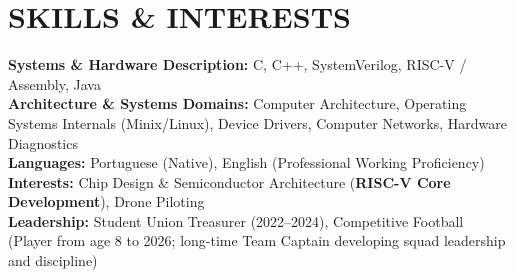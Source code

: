 \documentclass[letterpaper,11pt]{article}
\begin{document}
\section{SKILLS \& INTERESTS}
 \begin{itemize}[leftmargin=0in, label={}]
    \small{\item{
     \textbf{Systems \& Hardware Description:} {C, C++, SystemVerilog, RISC-V / Assembly, Java}\vspace{2pt} \\
     \textbf{Architecture \& Systems Domains:} {Computer Architecture, Operating Systems Internals (Minix/Linux), Device Drivers, Computer Networks, Hardware Diagnostics}\vspace{2pt} \\
     \textbf{Languages:} {Portuguese (Native), English (Professional Working Proficiency)}\vspace{2pt} \\
     \textbf{Interests:} {Chip Design \& Semiconductor Architecture (\textbf{RISC-V Core Development}), Drone Piloting}\vspace{2pt} \\
     \textbf{Leadership:} {Student Union Treasurer (2022--2024), Competitive Football (Player from age 8 to 2026; long-time Team Captain developing squad leadership and discipline)}
    }}
 \end{itemize}

\end{document}
